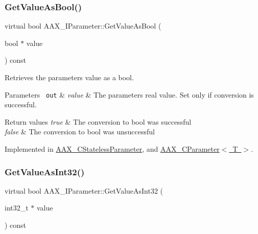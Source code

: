 \mbox{\label{a01857_a9d86d7e89489e7f7ccbacaa55eb98f72}} 
\subsubsection{\texorpdfstring{GetValueAsBool()}{GetValueAsBool()}}
{\footnotesize\ttfamily virtual bool A\+A\+X\+\_\+\+I\+Parameter\+::\+Get\+Value\+As\+Bool (\begin{DoxyParamCaption}\item[{bool $\ast$}]{value }\end{DoxyParamCaption}) const\hspace{0.3cm}{\ttfamily [pure virtual]}}



Retrieves the parameter\textquotesingle{}s value as a bool. 


\begin{DoxyParams}[1]{Parameters}
\mbox{\texttt{ out}}  & {\em value} & The parameter\textquotesingle{}s real value. Set only if conversion is successful.\\
\hline
\end{DoxyParams}

\begin{DoxyRetVals}{Return values}
{\em true} & The conversion to bool was successful \\
\hline
{\em false} & The conversion to bool was unsuccessful \\
\hline
\end{DoxyRetVals}


Implemented in \mbox{\hyperlink{a01541_ae28486d2b97c869b7626e5d57ca783df}{A\+A\+X\+\_\+\+C\+Stateless\+Parameter}}, and \mbox{\hyperlink{a01537_a70d1b697d4a449b57de917baa0b50e95}{A\+A\+X\+\_\+\+C\+Parameter$<$ T $>$}}.

\mbox{\label{a01857_a2a7d538cbb30de98c5d55acdddbec05f}} 
\subsubsection{\texorpdfstring{GetValueAsInt32()}{GetValueAsInt32()}}
{\footnotesize\ttfamily virtual bool A\+A\+X\+\_\+\+I\+Parameter\+::\+Get\+Value\+As\+Int32 (\begin{DoxyParamCaption}\item[{int32\+\_\+t $\ast$}]{value }\end{DoxyParamCaption}) const\hspace{0.3cm}{\ttfamily [pure virtual]}}



